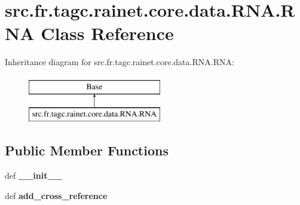 \hypertarget{classsrc_1_1fr_1_1tagc_1_1rainet_1_1core_1_1data_1_1RNA_1_1RNA}{\section{src.\-fr.\-tagc.\-rainet.\-core.\-data.\-R\-N\-A.\-R\-N\-A Class Reference}
\label{classsrc_1_1fr_1_1tagc_1_1rainet_1_1core_1_1data_1_1RNA_1_1RNA}
}
Inheritance diagram for src.\-fr.\-tagc.\-rainet.\-core.\-data.\-R\-N\-A.\-R\-N\-A\-:\begin{figure}[H]
\begin{center}
\leavevmode
\includegraphics[height=2.000000cm]{classsrc_1_1fr_1_1tagc_1_1rainet_1_1core_1_1data_1_1RNA_1_1RNA}
\end{center}
\end{figure}
\subsection*{Public Member Functions}
\begin{DoxyCompactItemize}
\item 
\hypertarget{classsrc_1_1fr_1_1tagc_1_1rainet_1_1core_1_1data_1_1RNA_1_1RNA_ad891561409a389b7c0d3f05016abccd6}{def {\bfseries \-\_\-\-\_\-init\-\_\-\-\_\-}}\label{classsrc_1_1fr_1_1tagc_1_1rainet_1_1core_1_1data_1_1RNA_1_1RNA_ad891561409a389b7c0d3f05016abccd6}

\item 
\hypertarget{classsrc_1_1fr_1_1tagc_1_1rainet_1_1core_1_1data_1_1RNA_1_1RNA_a6e47222a70b4564f62bc4c31e3ad6410}{def {\bfseries add\-\_\-cross\-\_\-reference}}\label{classsrc_1_1fr_1_1tagc_1_1rainet_1_1core_1_1data_1_1RNA_1_1RNA_a6e47222a70b4564f62bc4c31e3ad6410}

\end{DoxyCompactItemize}
